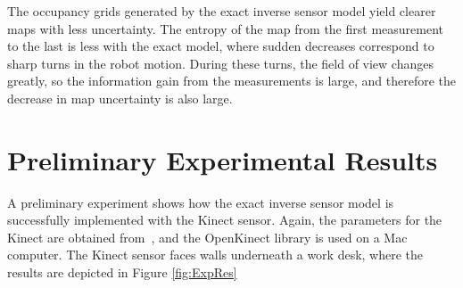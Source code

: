 \documentclass[letterpaper, 10pt, conference]{ieeeconf}
\begin{document}
The occupancy grids generated by the exact inverse sensor model yield clearer maps with less uncertainty.
The entropy of the map from the first measurement to the last is less with the exact model, where sudden decreases correspond to sharp turns in the robot motion.
During these turns, the field of view changes greatly, so the information gain from the measurements is large, and therefore the decrease in map uncertainty is also large.

\section{Preliminary Experimental Results}
\label{sec:ExpRes}

A preliminary experiment shows how the exact inverse sensor model is successfully implemented with the Kinect sensor.
Again, the parameters for the Kinect are obtained from~\cite{KhoElb12}, and the OpenKinect library is used on a Mac computer.
The Kinect sensor faces walls underneath a work desk, where the results are depicted in Figure \ref{fig:ExpRes}
\end{document}
